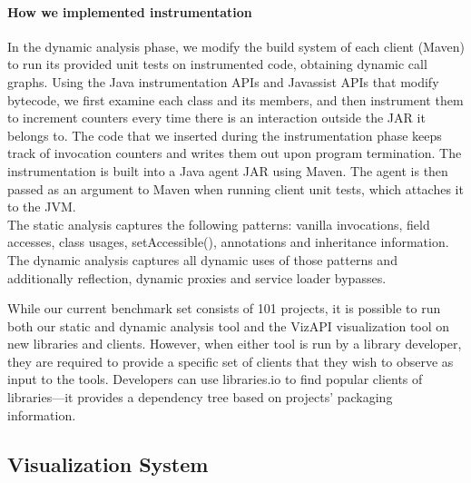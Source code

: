 \paragraph{How we implemented instrumentation}
In the dynamic analysis phase, we modify the build system of each
client (Maven) to run its provided unit tests on instrumented code,
obtaining dynamic call graphs. 
Using the Java instrumentation APIs and Javassist APIs that modify bytecode,
we first examine each class and its members,
and then instrument them to increment counters every time there is an interaction outside the JAR it belongs to.
The code that we inserted during the instrumentation phase keeps track of invocation counters
and writes them out upon program termination.
The instrumentation is built into a Java agent JAR using Maven.
The agent is then passed as an argument to Maven when running client unit tests, which attaches it to the JVM.\\

The static analysis captures the
following patterns: vanilla invocations, field accesses, class usages,
setAccessible(), annotations and inheritance information. The dynamic
analysis captures all dynamic uses of those patterns and additionally
reflection, dynamic proxies and service loader bypasses.

While our current benchmark set consists of 101 projects, it is possible to run both our static and dynamic analysis tool and the VizAPI visualization tool on new libraries and clients. However, when either tool is run by a library developer, they are required to provide a specific set of clients that they wish to observe as input to the tools. Developers can use libraries.io to find popular clients of libraries---it provides a dependency tree based on projects' packaging information.


\subsection{Visualization System}
\label{subsec:vis-system}

